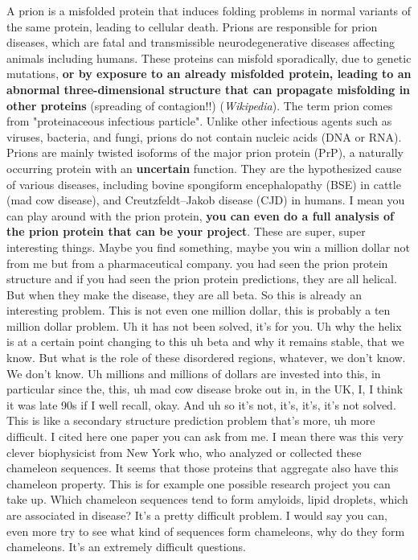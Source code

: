 A prion is a misfolded protein that induces folding problems in normal variants of the same protein, leading to cellular death. 
Prions are responsible for prion diseases, which are fatal and transmissible neurodegenerative diseases affecting animals including humans. 
These proteins can misfold sporadically, due to genetic mutations, \textbf{or by exposure to an already misfolded protein, leading to an abnormal three-dimensional structure that can propagate 
misfolding in other proteins} (spreading of contagion!!) (\textit{Wikipedia}). The term prion comes from "proteinaceous infectious particle". Unlike other infectious agents such as viruses, bacteria, and fungi, prions do not contain nucleic acids (DNA or RNA). 
Prions are mainly twisted isoforms of the major prion protein (PrP), a naturally occurring protein with an \textbf{uncertain} function. 
They are the hypothesized cause of various diseases, including  bovine spongiform encephalopathy (BSE) in cattle (mad cow disease), 
and Creutzfeldt–Jakob disease (CJD) in humans.  I mean you can play around with the prion protein, \textbf{you can even do a full analysis of the prion protein that can be your project}. These are super, super interesting things. 
Maybe you find something, maybe you win a million dollar not from me but from a pharmaceutical company. you had seen the prion protein structure and if you had seen the prion protein predictions, they are all helical. But when they make the disease, they are all beta. So this is already an interesting problem. This is not even one million dollar, this is probably a ten million dollar problem. Uh it has not been solved, it's for you. Uh why the helix is at a certain point changing to this uh beta and why it remains stable, that we know. But what is the role of these disordered regions, whatever, we don't know. We don't know. Uh millions and millions of dollars are invested into this, in particular since the, this, uh mad cow disease broke out in, in the UK, I, I think it was late 90s if I well recall, okay. And uh so it's not, it's, it's, it's not solved. This is like a secondary structure prediction problem that's more, uh more difficult. 
I cited here one paper you can ask from me. I mean there was this very clever biophysicist from New York who, who analyzed or collected these chameleon sequences. It seems that those proteins that aggregate also have this chameleon property.
This is for example one possible research project you can take up. Which chameleon sequences tend to form amyloids, lipid droplets, which are associated in disease? It's a pretty difficult problem. 
I would say you can, even more try to see what kind of sequences form chameleons, why do they form chameleons. It's an extremely difficult questions. 


